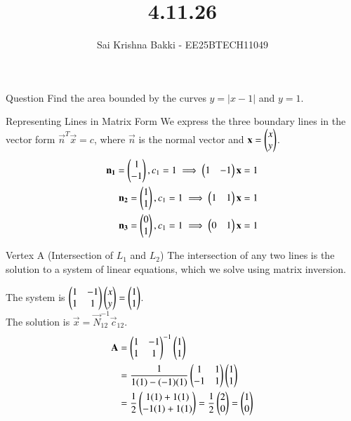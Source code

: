 \documentclass{beamer}
\title %
{4.11.26}
\date{}
\author %
{Sai Krishna Bakki - EE25BTECH11049}
\begin{document}
\frame{\titlepage}
\begin{frame}{Question}
Find the area bounded by the curves $y = |x - 1|$ and $y = 1$.
\end{frame}

\begin{frame}{Representing Lines in Matrix Form}
We express the three boundary lines in the vector form $\vec{n}^T \vec{x} = c$, where $\vec{n}$ is the normal vector and $\mathbf{x} = \begin{pmatrix}x \\ y\end{pmatrix}$.
\begin{align}
    \mathbf{n_1}=\begin{pmatrix}1\\-1\end{pmatrix},c_1=1\implies \begin{pmatrix}1 & -1\end{pmatrix}\mathbf{x}=1\\
    \mathbf{n_2}=\begin{pmatrix}1\\1\end{pmatrix},c_1=1\implies \begin{pmatrix}1 & 1\end{pmatrix}\mathbf{x}=1\\
    \mathbf{n_3}=\begin{pmatrix}0\\1\end{pmatrix},c_1=1\implies \begin{pmatrix}0 &1\end{pmatrix}\mathbf{x}=1
\end{align}
\end{frame}
\begin{frame}{Vertex A (Intersection of $L_1$ and $L_2$)}
The intersection of any two lines is the solution to a system of linear equations, which we solve using matrix inversion.

The system is $\begin{pmatrix}1 & -1 \\ 1 & 1\end{pmatrix} \begin{pmatrix}x \\ y\end{pmatrix} = \begin{pmatrix}1 \\ 1\end{pmatrix}$. \\The solution is $\vec{x} = \vec{N}_{12}^{-1}\vec{c}_{12}$.\\
\begin{align}  
\mathbf{A} &= \begin{pmatrix}1 & -1 \\ 1 & 1\end{pmatrix}^{-1} \begin{pmatrix}1 \\ 1\end{pmatrix} \\
&= \frac{1}{1(1) - (-1)(1)} \begin{pmatrix}1 & 1 \\ -1 & 1\end{pmatrix} \begin{pmatrix}1 \\ 1\end{pmatrix} \\
&= \frac{1}{2} \begin{pmatrix}1(1) + 1(1) \\ -1(1) + 1(1)\end{pmatrix} = \frac{1}{2} \begin{pmatrix}2 \\ 0\end{pmatrix} = \begin{pmatrix}1 \\ 0\end{pmatrix}
\end{align}  
\end{frame}
\end{document}
